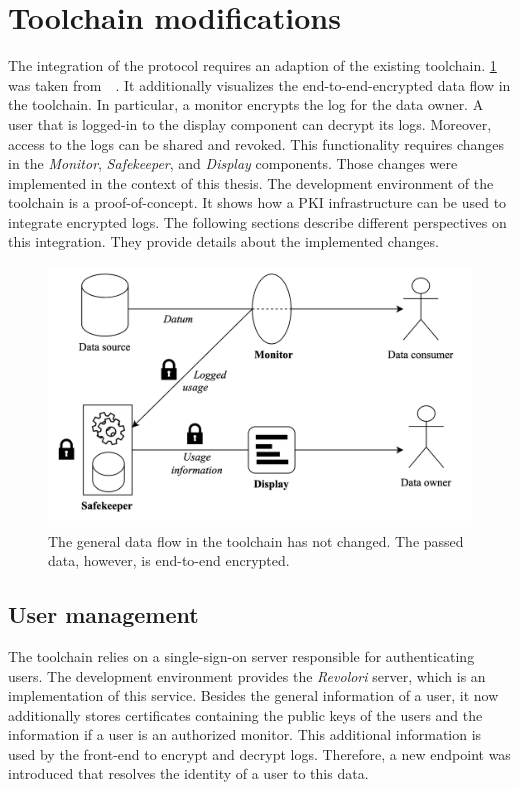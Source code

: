 \documentclass[../main.tex]{subfiles}
\begin{document}
\section{Toolchain modifications}
\label{sec:toolchain-modifications}
The integration of the protocol requires an adaption of the existing toolchain.
\cref{fig:encrypted-toolchain} was taken from~\citeauthor{Zieglmeier2021}~\cite{Zieglmeier2021}.
It additionally visualizes the end-to-end-encrypted data flow in the toolchain.
In particular, a monitor encrypts the log for the data owner.
A user that is logged-in to the display component can decrypt its logs.
Moreover, access to the logs can be shared and revoked.
This functionality requires changes in the \emph{Monitor}, \emph{Safekeeper}, and \emph{Display} components.
Those changes were implemented in the context of this thesis.
The development environment of the toolchain is a proof-of-concept.
It shows how a PKI infrastructure can be used to integrate encrypted logs.
The following sections describe different perspectives on this integration.
They provide details about the implemented changes.


\begin{figure}[h!]
    \includegraphics[scale=0.16]{../img/06/encrypted_toolchain.png}
    \centering
    \caption[Toolchain encrypted data flow]{The general data flow in the toolchain has not changed. The passed data, however, is end-to-end encrypted.}
    \label{fig:encrypted-toolchain}
\end{figure}

\subsection{User management}
The toolchain relies on a single-sign-on server responsible for authenticating users.
The development environment provides the \emph{Revolori} server, which is an implementation of this service.
Besides the general information of a user, it now additionally stores certificates containing the public keys of the users and the information if a user is an authorized monitor.
This additional information is used by the front-end to encrypt and decrypt logs.
Therefore, a new endpoint was introduced that resolves the identity of a user to this data.
\end{document}
